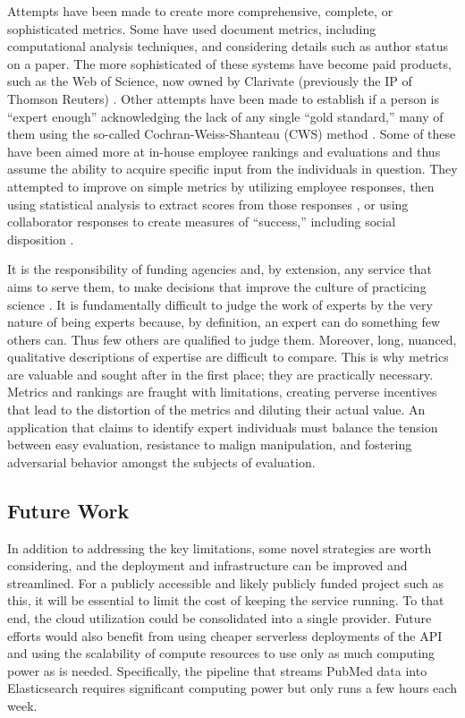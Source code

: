 Attempts have been made to create more comprehensive, complete, or sophisticated metrics. Some have used document metrics, including computational analysis techniques, and considering details such as author status on a paper. The more sophisticated of these systems have become paid products, such as the Web of Science, now owned by Clarivate (previously the IP of Thomson Reuters) \cite{ref-metrics-using-metrics}. Other attempts have been made to establish if a person is ``expert enough'' acknowledging the lack of any single ``gold standard,'' many of them using the so-called Cochran-Weiss-Shanteau (CWS) method \cite{ref-approach-to-identifying-smes}. Some of these have been aimed more at in-house employee rankings and evaluations and thus assume the ability to acquire specific input from the individuals in question. They attempted to improve on simple metrics by utilizing employee responses, then using statistical analysis to extract scores from those responses \cite{ref-metrics-cws-guide}, or using collaborator responses to create measures of ``success,'' including social disposition \cite{ref-metrics-psycho-scale}.

It is the responsibility of funding agencies and, by extension, any service that aims to serve them, to make decisions that improve the culture of practicing science \cite{ref-metrics-games-academics-play}. It is fundamentally difficult to judge the work of experts by the very nature of being experts because, by definition, an expert can do something few others can. Thus few others are qualified to judge them. Moreover, long, nuanced, qualitative descriptions of expertise are difficult to compare. This is why metrics are valuable and sought after in the first place; they are practically necessary. Metrics and rankings are fraught with limitations, creating perverse incentives that lead to the distortion of the metrics and diluting their actual value. An application that claims to identify expert individuals must balance the tension between easy evaluation, resistance to malign manipulation, and fostering adversarial behavior amongst the subjects of evaluation. 

\subsection{Future Work}

In addition to addressing the key limitations, some novel strategies are worth considering, and the deployment and infrastructure can be improved and streamlined. For a publicly accessible and likely publicly funded project such as this, it will be essential to limit the cost of keeping the service running. To that end, the cloud utilization could be consolidated into a single provider. Future efforts would also benefit from using cheaper serverless deployments of the API and using the scalability of compute resources to use only as much computing power as is needed. Specifically, the pipeline that streams PubMed data into Elasticsearch requires significant computing power but only runs a few hours each week. 

